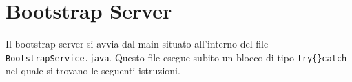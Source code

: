 \chapter{Bootstrap Server}

Il bootstrap server si avvia dal main situato all'interno del file \verb|BootstrapService.java|. Questo file esegue subito un blocco di tipo \verb|try{}catch| nel quale si trovano le seguenti istruzioni.

\begin{lstlisting}

\end{lstlisting}